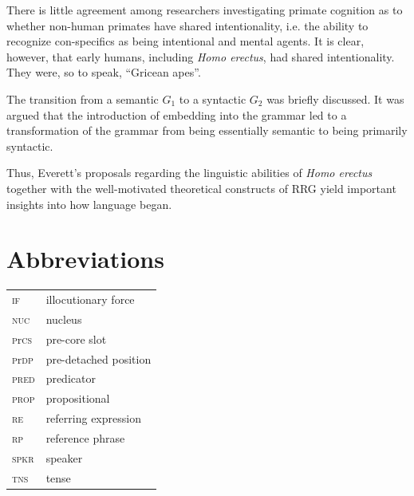 \documentclass[output=paper,colorlinks,citecolor=brown]{langscibook}
\begin{document}
There is little agreement among researchers investigating primate cognition as to whether non-human primates have shared intentionality, i.e. the ability to recognize con-specifics as being intentional and mental agents.  It is clear, however, that early humans, including \emph{Homo erectus}, had shared intentionality.  They were, so to speak, “Gricean apes”.

The transition from a semantic $G_1$ to a syntactic $G_2$ was briefly discussed.  It was argued that the introduction of embedding into the grammar led to a transformation of the grammar from being essentially semantic to being primarily syntactic.

Thus, Everett’s proposals regarding the linguistic abilities of \emph{Homo erectus} together with the well-motivated theoretical constructs of RRG yield important insights into how language began.

\section*{Abbreviations}
\begin{tabularx}{.5\textwidth}{@{}lQ@{}}
\textsc{if} & illocutionary force \\
\textsc{nuc} & nucleus \\
\textsc{p}r\textsc{cs} & pre-core slot \\
\textsc{p}r\textsc{dp} & pre-detached position \\
\textsc{pred} & predicator \\
\textsc{prop} & propositional \\
\textsc{re} & referring expression \\
\textsc{rp} & reference phrase \\
\textsc{spkr} & speaker \\
\textsc{tns} & tense \\
\end{tabularx}

\printbibliography[heading=subbibliography,notkeyword=this]
\end{document}
